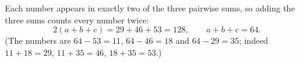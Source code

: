 Each number appears in exactly two of the three pairwise sums, so adding the three sums counts every number twice:
\[2(a+b+c)=29+46+53=128,\qquad a+b+c=\boxed{64}.\]
(The numbers are $64-53=11$, $64-46=18$ and $64-29=35$; indeed $11+18=29$, $11+35=46$, $18+35=53$.)
